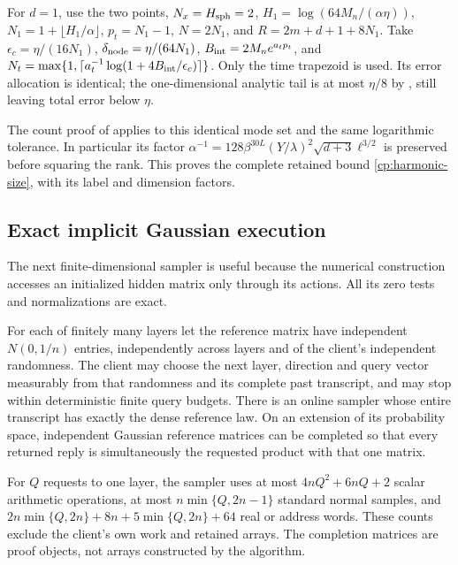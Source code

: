 For $d=1$, use the two points, $N_x=H_{\rm sph}=2$,
$H_1=\log(64M_n/(\alpha\eta))$, $N_1=1+\lfloor H_1/\alpha\rfloor$,
$p_t=N_1-1$, $N=2N_1$, and $R=2m+d+1+8N_1$.
Take $\epsilon_c=\eta/(16N_1)$,
$\delta_{\rm node}=\eta/(64N_1)$, $B_{\rm int}=2M_ne^{a_tp_t}$,
and $N_t=\max\{1,\lceil a_t^{-1}\log(1+4B_{\rm int}/\epsilon_c)\rceil\}$.
Only the time trapezoid is used. Its error allocation is identical;
the one-dimensional analytic tail is at most $\eta/8$ by
, still leaving total error below
$\eta$.

The count proof of  applies to this identical
mode set and the same logarithmic tolerance. In particular its factor
$\alpha^{-1}=128\beta^{30L}(Y/\lambda)^2\sqrt{d+3}\ell^{3/2}$
is preserved before squaring the rank. This proves the complete retained
bound \eqref{cp:harmonic-size}, with its label and dimension factors.

\subsection{Exact implicit Gaussian execution}
\label{cp:init:sec:implicit}

The next finite-dimensional sampler is useful because the numerical
construction accesses an initialized hidden matrix only through its actions.
All its zero tests and normalizations are exact.

\begin{lemma}
\label{cp:init:gaussian-sampler}

For each of finitely many layers let the reference matrix have independent
$N(0,1/n)$ entries, independently across layers and of the client's
independent randomness. The client may choose the next layer, direction and
query vector measurably from that randomness and its complete past
transcript, and may stop within deterministic finite query budgets.
There is an online sampler whose entire transcript has exactly the dense
reference law. On an extension of its probability space, independent
Gaussian reference matrices can be completed so that every returned reply
is simultaneously the requested product with that one matrix.

For $Q$ requests to one layer, the sampler uses at most
$4nQ^2+6nQ+2$ scalar arithmetic operations, at most
$n\min\{Q,2n-1\}$ standard normal samples, and
$2n\min\{Q,2n\}+8n+5\min\{Q,2n\}+64$ real or address words.
These counts exclude the client's own work and retained arrays. The
completion matrices are proof objects, not arrays constructed by the algorithm.
\end{lemma}

